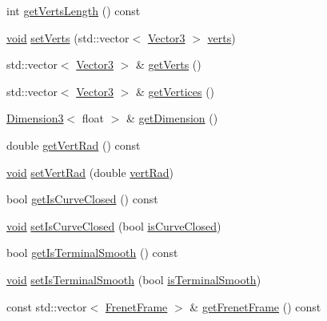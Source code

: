 \begin{DoxyCompactItemize}
\item 
int \hyperlink{class_curve3_acbe74bd0e052c765f6e117b930824dae}{get\-Verts\-Length} () const 
\item 
\hyperlink{glutf90_8h_ac778d6f63f1aaf8ebda0ce6ac821b56e}{void} \hyperlink{class_curve3_a8c964fc61855616010a4f89782d2a123}{set\-Verts} (std\-::vector$<$ \hyperlink{class_vector3}{Vector3} $>$ \hyperlink{class_curve3_a9937ea75c1a2467d1dc61605c5b958c8}{verts})
\item 
std\-::vector$<$ \hyperlink{class_vector3}{Vector3} $>$ \& \hyperlink{class_curve3_ab52692d2a2b548f2b9837d04bd70e7fb}{get\-Verts} ()
\item 
std\-::vector$<$ \hyperlink{class_vector3}{Vector3} $>$ \& \hyperlink{class_curve3_a1336793bc5394a7858479910aab1bae6}{get\-Vertices} ()
\item 
\hyperlink{class_dimension3}{Dimension3}$<$ float $>$ \& \hyperlink{class_curve3_ac88900ec63684247812ed7b86b09dd71}{get\-Dimension} ()
\item 
double \hyperlink{class_curve3_a6965f39c1512df70ea5133bc6b21f034}{get\-Vert\-Rad} () const 
\item 
\hyperlink{glutf90_8h_ac778d6f63f1aaf8ebda0ce6ac821b56e}{void} \hyperlink{class_curve3_ab8b300b3ea2e2fc071bacaa1100ebf24}{set\-Vert\-Rad} (double \hyperlink{class_curve3_a404b74eb4ad6ac9796b766ff1a36d823}{vert\-Rad})
\item 
bool \hyperlink{class_curve3_ac78c8815970e831ef0e3d9f51bac0636}{get\-Is\-Curve\-Closed} () const 
\item 
\hyperlink{glutf90_8h_ac778d6f63f1aaf8ebda0ce6ac821b56e}{void} \hyperlink{class_curve3_a656565930a73e9d1cdc03f424ba0d323}{set\-Is\-Curve\-Closed} (bool \hyperlink{class_curve3_a94b01af1a451e35dbcec9ef36c4b4a64}{is\-Curve\-Closed})
\item 
bool \hyperlink{class_curve3_afcd982fd3e0b6eec3d841e570c9beffb}{get\-Is\-Terminal\-Smooth} () const 
\item 
\hyperlink{glutf90_8h_ac778d6f63f1aaf8ebda0ce6ac821b56e}{void} \hyperlink{class_curve3_ad280540e1e732533780a7e92f1c5c171}{set\-Is\-Terminal\-Smooth} (bool \hyperlink{class_curve3_af842d273f3cdbb907f66ffed7b72d2a5}{is\-Terminal\-Smooth})
\item 
const std\-::vector$<$ \hyperlink{class_frenet_frame}{Frenet\-Frame} $>$ \& \hyperlink{class_curve3_a3badf7d24d4afabf44855c69050f06c5}{get\-Frenet\-Frame} () const 
\end{DoxyCompactItemize}
